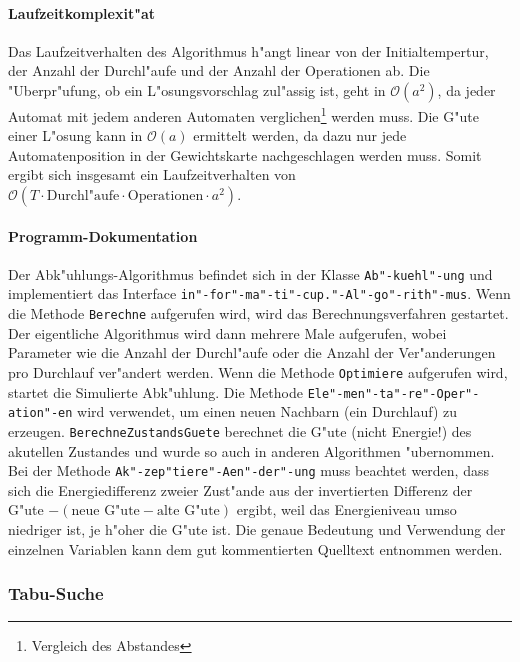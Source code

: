 \paragraph{Laufzeitkomplexit"at}
Das Laufzeitverhalten des Algorithmus h"angt linear von der Initialtempertur, der Anzahl der Durchl"aufe und der Anzahl der Operationen ab. Die "Uberpr"ufung, ob ein L"osungsvorschlag zul"assig ist, geht in \(\mathcal{O}(a^2)\), da jeder Automat mit jedem anderen Automaten verglichen\footnote{Vergleich des Abstandes} werden muss. Die G"ute einer L"osung kann in \(\mathcal{O}(a)\) ermittelt werden, da dazu nur jede Automatenposition in der Gewichtskarte nachgeschlagen werden muss. Somit ergibt sich insgesamt ein Laufzeitverhalten von \(\mathcal{O}(T \cdot \mbox{Durchl"aufe} \cdot \mbox{Operationen} \cdot a^2)\).

\paragraph{Programm-Dokumentation}
Der Abk"uhlungs-Algorithmus befindet sich in der Klasse \texttt{Ab"-kuehl"-ung} und implementiert das Interface \texttt{in"-for"-ma"-ti"-cup."-Al"-go"-rith"-mus}. Wenn die Methode \texttt{Berechne} aufgerufen wird, wird das Berechnungsverfahren gestartet. Der eigentliche Algorithmus wird dann mehrere Male aufgerufen, wobei Parameter wie die Anzahl der Durchl"aufe oder die Anzahl der Ver"anderungen pro Durchlauf ver"andert werden. Wenn die Methode \texttt{Optimiere} aufgerufen wird, startet die Simulierte Abk"uhlung. Die Methode \texttt{Ele"-men"-ta"-re"-Oper"-ation"-en} wird verwendet, um einen neuen Nachbarn (ein Durchlauf) zu erzeugen. \texttt{BerechneZustandsGuete} berechnet die G"ute (nicht Energie!) des akutellen Zustandes und wurde so auch in anderen Algorithmen "ubernommen. Bei der Methode \texttt{Ak"-zep"tiere"-Aen"-der"-ung} muss beachtet werden, dass sich die Energiedifferenz zweier Zust"ande aus der invertierten Differenz der G"ute \(-(\mbox{neue G"ute} - \mbox{alte G"ute})\) ergibt, weil das Energieniveau umso niedriger ist, je h"oher die G"ute ist. Die genaue Bedeutung und Verwendung der einzelnen Variablen kann dem gut kommentierten Quelltext entnommen werden.

\subsubsection{Tabu-Suche}

